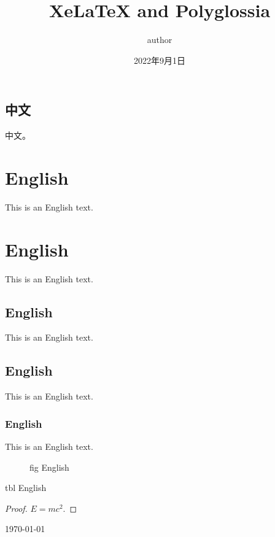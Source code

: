 \documentclass[11pt]{article}
\title{XeLaTeX and Polyglossia}
\author{author}
\date{2022年9月1日}
\begin{document}
\begin{chinese}

\tableofcontents

\listoftables
{}
\listoffigures
\end{chinese}
\pagebreak

\begin{chinese}
\section{中文}
中文。
\end{chinese}

\section{English}
\begin{english}
This is an English text.
\section{English}
This is an English text.
\subsection{English}
This is an English text.
\subsection{English}
This is an English text.
\subsubsection{English}
This is an English text.

\begin{figure}
\caption{fig English}
\end{figure}
\begin{table}
\caption{tbl English}
\end{table}
\begin{proof}
$E = mc^2.$
\end{proof}

\today
\end{english}
\end{document}
